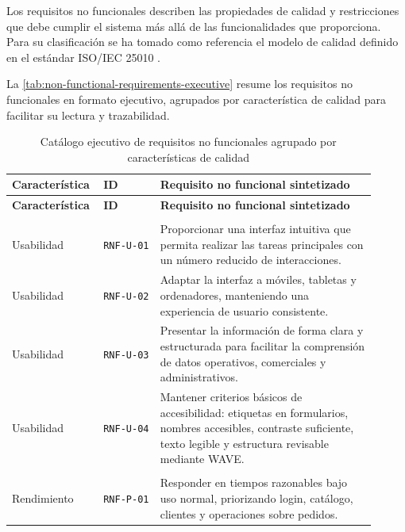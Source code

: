 Los requisitos no funcionales describen las propiedades de calidad y restricciones que debe cumplir el sistema más allá de las funcionalidades que proporciona. Para su clasificación se ha tomado como referencia el modelo de calidad definido en el estándar ISO/IEC 25010 \cite{iso25010}.

La \autoref{tab:non-functional-requirements-executive} resume los requisitos no funcionales en formato ejecutivo, agrupados por característica de calidad para facilitar su lectura y trazabilidad.

{\scriptsize
\setlength{\tabcolsep}{3pt}
\renewcommand{\arraystretch}{1.14}
\newcommand{\RNFCategoryHeader}[1]{%
\hline\hline
\multicolumn{3}{|>{\RaggedRight\arraybackslash}p{0.91\linewidth}|}{\textbf{#1}}\\
\hline\hline
}
\begin{longtable}{|>{\RaggedRight\arraybackslash}p{0.18\linewidth}|>{\RaggedRight\arraybackslash}p{0.15\linewidth}|>{\RaggedRight\arraybackslash}p{0.58\linewidth}|}
\caption{Catálogo ejecutivo de requisitos no funcionales agrupado por características de calidad}
\label{tab:non-functional-requirements-executive}\\
\hline
\textbf{Característica} & \textbf{ID} & \textbf{Requisito no funcional sintetizado} \\
\hline
\endfirsthead
\hline
\textbf{Característica} & \textbf{ID} & \textbf{Requisito no funcional sintetizado} \\
\hline
\endhead
\RNFCategoryHeader{RNF1. Usabilidad}
Usabilidad & \texttt{RNF-U-01} & Proporcionar una interfaz intuitiva que permita realizar las tareas principales con un número reducido de interacciones. \\
\hline
Usabilidad & \texttt{RNF-U-02} & Adaptar la interfaz a móviles, tabletas y ordenadores, manteniendo una experiencia de usuario consistente. \\
\hline
Usabilidad & \texttt{RNF-U-03} & Presentar la información de forma clara y estructurada para facilitar la comprensión de datos operativos, comerciales y administrativos. \\
\hline
Usabilidad & \texttt{RNF-U-04} & Mantener criterios básicos de accesibilidad: etiquetas en formularios, nombres accesibles, contraste suficiente, texto legible y estructura revisable mediante WAVE. \\
\hline
\RNFCategoryHeader{RNF2. Eficiencia de rendimiento}
Rendimiento & \texttt{RNF-P-01} & Responder en tiempos razonables bajo uso normal, priorizando login, catálogo, clientes y operaciones sobre pedidos. \\

\end{longtable}}
